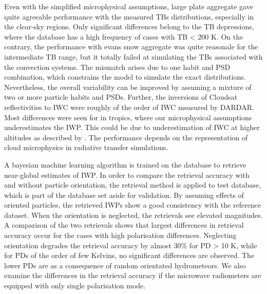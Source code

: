 \documentclass[amt, manuscript]{copernicus}
\begin{document}
Even with the simplified microphysical assumptions, large plate aggregate gave quite agreeable performance with the measured TBs distributions, especially in the clear-sky regions. Only significant differences belong to the TB depressions, where the database has a high frequency of cases with TB < 200\,\,K. On the contrary, the performance with evans snow aggregate was quite reasonale for the intermediate TB range, but it totally failed at simulating the TBs associated with the convection systems. The mismatch arises due to one habit and PSD combination, which constrains the model to simulate the exact distributions. Nevertheless, the overall variability can be improved by assuming a mixture of two or more particle habits and PSDs. Further, the inversions of Cloudsat reflectivities to IWC were roughly of the order of IWC measured by DARDAR. Most differences were seen for in tropics, where our microphysical assumptions underestimates the IWP. This could be due to underestimation of IWC at higher altitudes as described by \citet{ekelund2020using}. The performance depends on the representation of cloud microphysics in radiative transfer simulations.  

A bayesian machine learning algorithm is trained on the database to retrieve near-global estimates of IWP. In order to compare the retrieval accuracy with and without particle orientation, the retrieval method is applied to test database, which is part of the database set aside for validation. By assuming effects of oriented particles, the retrieved IWPs  show a good consistency with the reference dataset. When the orientation is neglected, the retrievals see elevated magnitudes. A comparison of the two retrievals shows that largest differences in retrieval accuracy occur for the cases with high polarisation differences. Neglecting orientation degrades the retrieval accuracy by almost 30\% for PD > 10\,\,K, while for PDs of the order of few Kelvins, no significant differences are observed. The lower PDs are as a consequence of random orientated hydrometeors. We also examine the differences in the retrieval accuracy if the microwave radiometers are equipped with only single polarisation mode. 
\end{document}
